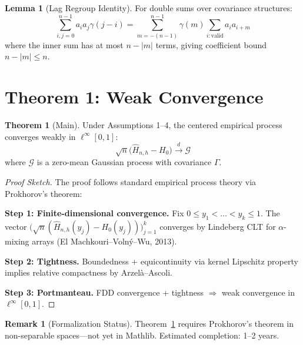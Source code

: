 \documentclass[final,3p,twocolumn,times,authoryear]{elsarticle}
\theoremstyle{definition}
\newtheorem{theorem}{Theorem}[section]
\newtheorem{lemma}{Lemma}[section]
\newtheorem{remark}{Remark}[section]
\begin{document}
\begin{lemma}[Lag Regroup Identity]
\label{lem:lag-regroup}
For double sums over covariance structures:
\begin{equation}
\sum_{i,j=0}^{n-1} a_i a_j \gamma(j-i) = \sum_{m=-(n-1)}^{n-1} \gamma(m) \sum_{i: \text{valid}} a_i a_{i+m}
\end{equation}
where the inner sum has at most $n-|m|$ terms, giving coefficient bound $n-|m| \leq n$.
\end{lemma}

\section{Theorem 1: Weak Convergence}
\label{sec:theorem1}

\begin{theorem}[Main]
\label{thm:weak-conv}
Under Assumptions 1--4, the centered empirical process converges weakly in $\ell^\infty[0,1]$:
\begin{equation}
\sqrt{n}\bigl(\hat{H}_{n,h} - H_0\bigr) \stackrel{d}{\longrightarrow} \mathcal{G}
\end{equation}
where $\mathcal{G}$ is a zero-mean Gaussian process with covariance $\Gamma$.
\end{theorem}

\begin{proof}[Proof Sketch]
The proof follows standard empirical process theory via Prokhorov's theorem:

\textbf{Step 1: Finite-dimensional convergence.} Fix $0 \leq y_1 < \dots < y_k \leq 1$. The vector $\bigl(\sqrt{n}(\hat{H}_{n,h}(y_j) - H_0(y_j))\bigr)_{j=1}^k$ converges by Lindeberg CLT for $\alpha$-mixing arrays (El Machkouri--Volný--Wu, 2013).

\textbf{Step 2: Tightness.} Boundedness + equicontinuity via kernel Lipschitz property implies relative compactness by Arzelà--Ascoli.

\textbf{Step 3: Portmanteau.} FDD convergence + tightness $\Rightarrow$ weak convergence in $\ell^\infty[0,1]$.
\end{proof}

\begin{remark}[Formalization Status]
Theorem~\ref{thm:weak-conv} requires Prokhorov's theorem in non-separable spaces---not yet in Mathlib. Estimated completion: 1--2 years.
\end{remark}
\end{document}
